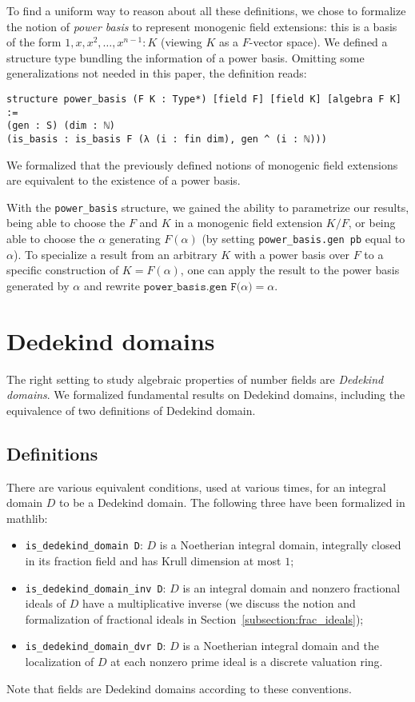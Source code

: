 \documentclass[a4paper,USenglish,cleveref, autoref, thm-restate]{lipics-v2021}
\newcommand{\lean}[1]{\texttt{#1}\xspace}
\newcommand{\mathlib}{\textsf{mathlib}\xspace}
\begin{document}
To find a uniform way to reason about all these definitions,
we chose to formalize the notion of \emph{power basis} to represent monogenic field extensions: this is a basis of the form $1, x, x^2, \dots, x^{n-1} : K$ (viewing $K$ as a $F$-vector space).
We defined a structure type bundling the information of a power basis.
Omitting some generalizations not needed in this paper, the definition reads:
\begin{lstlisting}
structure power_basis (F K : Type*) [field F] [field K] [algebra F K] :=
(gen : S) (dim : ℕ)
(is_basis : is_basis F (λ (i : fin dim), gen ^ (i : ℕ)))
\end{lstlisting}
We formalized that the previously defined notions of monogenic field extensions are equivalent to the existence of a power basis.

With the \lean{power\_basis} structure, we gained the ability to parametrize our results,
being able to choose the $F$ and $K$ in a monogenic field extension $K / F$, or being able to choose the $\alpha$ generating $F(\alpha)$ (by setting \lean{power\_basis.gen\ pb} equal to $\alpha$).
To specialize a result from an arbitrary $K$ with a power basis over $F$ to a specific construction of $K = F(\alpha)$,
one can apply the result to the power basis generated by $\alpha$ and rewrite $\lean{power\_basis.gen F($\alpha$)} = \alpha$.


\section{Dedekind domains} \label{sec:Dedekind-domain}
The right setting to study algebraic properties of number fields are \emph{Dedekind domains}.
We formalized fundamental results on Dedekind domains, including the equivalence of two definitions of Dedekind domain.

\subsection{Definitions}\label{subsec:definitions_DD}
There are various equivalent conditions, used at various times, for an integral domain $D$ to be a Dedekind domain.
The following three have been formalized in \mathlib:
\begin{itemize}
\item \lean{is\_dedekind\_domain D}: $D$ is a Noetherian integral domain, integrally closed in its fraction field and has Krull dimension at most $1$;
\item \lean{is\_dedekind\_domain\_inv D}: $D$ is an integral domain and nonzero fractional ideals of $D$ have a multiplicative inverse (we discuss the notion and formalization of fractional ideals in Section~\ref{subsection:frac_ideals});
\item \lean{is\_dedekind\_domain\_dvr D}: $D$ is a Noetherian integral domain and the localization of $D$ at each nonzero prime ideal is a discrete valuation ring.
\end{itemize}
Note that fields are Dedekind domains according to these conventions.
\end{document}
